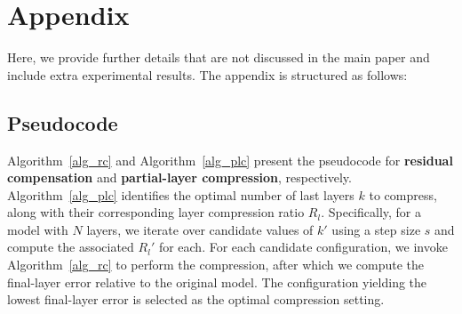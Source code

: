 \appendix
\section{Appendix} \label{Appendix}


Here, we provide further details that are not discussed in the main paper and include extra experimental results. The appendix is structured as follows:

\startcontents[appendices]

\subsection{Pseudocode} \label{pseudpcode}
Algorithm~\ref{alg_rc} and Algorithm~\ref{alg_plc} present the pseudocode for \textbf{residual compensation} and \textbf{partial-layer compression}, respectively.
Algorithm~\ref{alg_plc} identifies the optimal number of last layers $k$ to compress, along with their corresponding layer compression ratio $R_l$.
Specifically, for a model with $N$ layers, we iterate over candidate values of $k'$ using a step size $s$ and compute the associated $R_l'$ for each.
For each candidate configuration, we invoke Algorithm~\ref{alg_rc} to perform the compression, after which we compute the final-layer error relative to the original model.
The configuration yielding the lowest final-layer error is selected as the optimal compression setting.

